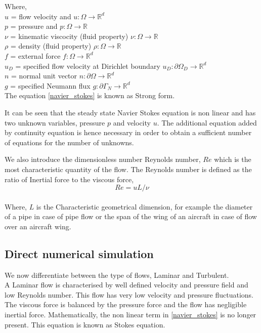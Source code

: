 \documentclass[a4paper,12pt]{book}
\begin{document}
Where,\\
$u$ = flow velocity and $u:\Omega \rightarrow \mathbb{R}^d$ \\
$p$ = pressure and $p:\Omega \rightarrow \mathbb{R}$\\
$\nu$ = kinematic viscocity (fluid property) $\nu:\Omega \rightarrow \mathbb{R}$\\ 
$\rho$ = density (fluid property) $\rho:\Omega \rightarrow \mathbb{R}$\\
$f$ = external force $f:\Omega \rightarrow \mathbb{R}^d$\\
$u_D$ = specified flow velocity at Dirichlet boundary $u_D:\partial \Omega_D \rightarrow \mathbb{R}^d$\\
$n$ = normal unit vector $n:\partial \Omega \rightarrow \mathbb{R}^d$\\
$g$ = specified Neumann flux $g:\partial \Gamma_N \rightarrow \mathbb{R}^d$\\

The equation \eqref{navier_stokes} is known as Strong form.

It can be seen that the steady state Navier Stokes equation is non linear and has two unknown variables, pressure $p$ and velocity $u$. The additional equation added by continuity equation is hence necessary in order to obtain a sufficient number of equations for the number of unknowns.

We also introduce the dimensionless number Reynolds number, $Re$ which is the most characteristic quantity of the flow. The Reynolds number is defined as the ratio of Inertial force to the viscous force,\\

\begin{equation} \label{reynolds_number}
Re =  u L / \nu
\end{equation}
\\

Where, $L$ is the Characteristic geometrical dimension, for example the diameter of a pipe in case of pipe flow or the span of the wing of an aircraft in case of flow over an aircraft wing.\\

\subsection{Direct numerical simulation} 

We now differentiate between the type of flows, Laminar and Turbulent.\\
A Laminar flow is characterised by well defined velocity and pressure field and low Reynolds number. This flow has very low velocity and pressure fluctuations. The viscous force is balanced by the pressure force and the flow has negligible inertial force. Mathematically, the non linear term in \eqref{navier_stokes} is no longer present. This equation is known as Stokes equation.\cite{white}\\
\end{document}
